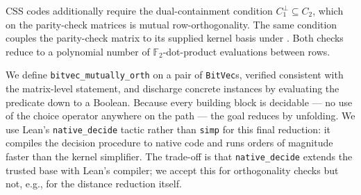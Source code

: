 CSS codes additionally require the dual-containment condition $C_1^\perp
\subseteq C_2$, which on the parity-check matrices is mutual row-orthogonality.
The same condition couples the parity-check matrix to its supplied kernel basis
under . Both checks reduce to a polynomial number of
$\mathbb{F}_2$-dot-product evaluations between rows.

We define \lstinline{bitvec_mutually_orth} on a pair of \lstinline{BitVec}s,
verified consistent with the matrix-level statement, and discharge concrete
instances by evaluating the predicate down to a Boolean. Because every building
block is decidable --- no use of the choice operator anywhere on the path ---
the goal reduces by unfolding. We use Lean's \lstinline{native_decide} tactic
rather than \lstinline{simp} for this final reduction: it compiles the decision
procedure to native code and runs orders of magnitude faster than the kernel
simplifier. The trade-off is that \lstinline{native_decide} extends the trusted
base with Lean's compiler; we accept this for orthogonality checks but not,
e.g., for the distance reduction itself.
